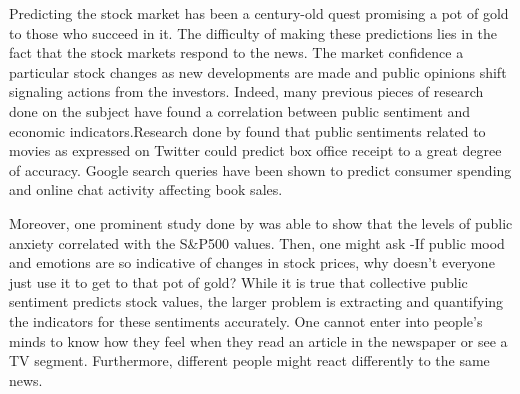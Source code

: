 \documentclass{acm_proc_article-sp}
\begin{document}
Predicting the stock market has been a century-old quest promising a pot of gold to those who succeed in it. The difficulty of making these predictions lies in the fact that the stock markets respond to the news. The market confidence a particular stock changes as new developments are made and public opinions shift signaling actions from the investors. Indeed, many previous pieces of research done on the subject have found a correlation between public sentiment and economic indicators.Research done by \cite{asur_predicting_2010} found that public sentiments related to movies as expressed on Twitter could predict box office receipt to a great degree of accuracy. Google search queries have been shown to predict consumer spending and online chat activity affecting book sales. 

Moreover, one prominent study done by \cite{gilbert_widespread_2010} was able to show that the levels of public anxiety correlated with the S&P500 values. Then, one might ask -If public mood and emotions are so indicative of changes in stock prices, why doesn't everyone just use it to get to that pot of gold?  While it is true that collective public sentiment predicts stock values, the larger problem is extracting and quantifying the indicators for these sentiments accurately. One cannot enter into people's minds to know how they feel when they read an article in the newspaper or see a TV segment. Furthermore, different people might react differently to the same news. 
\end{document}
